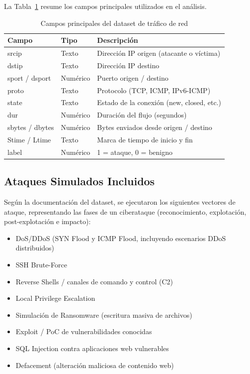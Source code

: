 \documentclass[conference]{IEEEtran}
\begin{document}
La Tabla~\ref{tab:dataset} resume los campos principales utilizados en el an\'alisis.

\begin{table}[h]
\centering
\caption{Campos principales del dataset de tr\'afico de red}
\label{tab:dataset}
\begin{tabular}{llp{5.5cm}}
\toprule
\textbf{Campo} & \textbf{Tipo} & \textbf{Descripci\'on} \\
\midrule
srcip & Texto & Direcci\'on IP origen (atacante o v\'ictima) \\
dstip & Texto & Direcci\'on IP destino \\
sport / dsport & Num\'erico & Puerto origen / destino \\
proto & Texto & Protocolo (TCP, ICMP, IPv6-ICMP) \\
state & Texto & Estado de la conexi\'on (new, closed, etc.) \\
dur & Num\'erico & Duraci\'on del flujo (segundos) \\
sbytes / dbytes & Num\'erico & Bytes enviados desde origen / destino \\
Stime / Ltime & Texto & Marca de tiempo de inicio y fin \\
label & Num\'erico & 1 = ataque, 0 = benigno \\
\bottomrule
\end{tabular}
\end{table}

\subsection{Ataques Simulados Incluidos}
Seg\'un la documentaci\'on del dataset, se ejecutaron los siguientes vectores de ataque, representando las fases de un ciberataque (reconocimiento, explotaci\'on, post-explotaci\'on e impacto):

\begin{itemize}
    \item DoS/DDoS (SYN Flood y ICMP Flood, incluyendo escenarios DDoS distribuidos)
    \item SSH Brute-Force
    \item Reverse Shells / canales de comando y control (C2)
    \item Local Privilege Escalation
    \item Simulaci\'on de Ransomware (escritura masiva de archivos)
    \item Exploit / PoC de vulnerabilidades conocidas
    \item SQL Injection contra aplicaciones web vulnerables
    \item Defacement (alteraci\'on maliciosa de contenido web)
\end{itemize}
\end{document}
